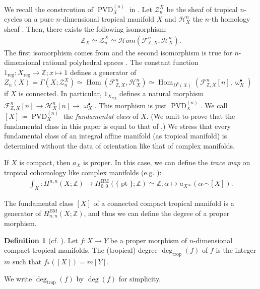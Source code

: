 \documentclass[a4paper,dvipdfmx,reqno,12pt]{amsart}
\theoremstyle{definition}
\newtheorem{definition}[theorem]{Definition}
\newcommand{\deq}{\coloneqq}
\newcommand{\opn}[1]{\operatorname{#1}}
\numberwithin{equation}{section}
\begin{document}
We recall the constrcution 
of $\opn{PVD}^{(n)}_X$ in \cite{gross2019sheaftheoretic}.
Let $\mathscr{Z}_n^{X}$ be the sheaf of tropical 
$n$-cycles \cite[Definition 3.5]{gross2019sheaftheoretic}
on a pure $n$-dimensional tropical manifold $X$ and 
$\mathcal{H}^{n}_X$ the $n$-th 
homology sheaf \cite[Definition 4.6]{gross2019sheaftheoretic}.
Then, there exists the following isomorphism:
\begin{align}
\mathbb{Z}_X \simeq\mathscr{Z}_n^{X}\simeq 
\mathcal{H}om(\mathcal{F}^{n}_{\mathbb{Z},X},
\mathcal{H}^{n}_X).
\end{align}
The first isomorphism comes from \cite[Lemma 2.4]{MR3041763} and
the second isomorphism is true for $n$-dimensional rational polyhedral 
spaces \cite[Proposition 5.1]{gross2019sheaftheoretic}.
The constant function
$1_{\opn{reg}}\colon X_{\opn{reg}} \to \mathbb{Z}; 
x\mapsto 1$ defines a generator of 
$Z_n(X)=\Gamma(X;\mathscr{Z}_n^{X})\simeq 
\opn{Hom}(\mathcal{F}^{n}_{\mathbb{Z},X},
\mathcal{H}^{n}_X)\simeq 
\opn{Hom}_{D^{b}(X)}(\mathcal{F}^{n}_{\mathbb{Z},X}[n],
\upomega_X^{\bullet})$ if $X$ is connected.
In particular, $1_{X_{\opn{reg}}}$ defines a 
natural morphism 
$\mathcal{F}^{n}_{\mathbb{Z},X}[n]\to \mathcal{H}^{n}_X[n] 
\to \upomega_X^{\bullet}$.
This morphism is just $\opn{PVD}^{(n)}_X$.
We call $[X]\deq \opn{PVD}_X^{(n)}$
the \emph{fundamental class} of $X$.
(We omit to prove that the fundamental class in this 
paper is equal to that of 
\cite[Definition 4.8]{MR3894860}.)
We stress that every fundamental class of an integral affine 
manifold (as tropical manifold) 
is determined without the data of orientation
like that of complex manifolds.

If $X$ is compact, then $a_{X}$ is proper. 
In this case,
we can define the \emph{trace map} 
on tropical cohomology like complex manifolds 
(e.g. \cite[Example 13.A.3]{MR2810322}):
\begin{align}  
\int_X \colon H^{n,n}(X;\mathbb{Z})\to 
H_{0,0}^{\opn{BM}}(\{\opn{pt}\};\mathbb{Z})\simeq 
\mathbb{Z}; \alpha \mapsto a_{X*}(\alpha \frown [X]).
\end{align}

The fundamental class $[X]$ of a connected compact
tropical manifold is a generator of 
$H_{n,n}^{\opn{BM}}(X;\mathbb{Z})$, and thus we 
can define the degree of a proper morphism.
\begin{definition}[{cf. \cite[Definition 2.11]{MR3668972}}]
Let $f\colon X \to Y$ be a proper morphism of 
$n$-dimensional compact tropical manifolds.
The (tropical) degree $\opn{deg}_{\opn{trop}}(f)$ of $f$ is the integer $m$
such that $f_*([X])=m[Y]$. 
\end{definition}
We write $\opn{deg}_{\opn{trop}}(f)$ by $\opn{deg}(f)$
for simplicity.
\end{document}
